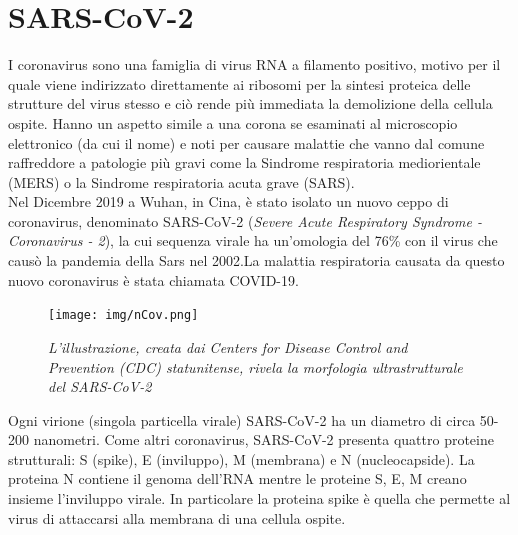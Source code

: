 \documentclass[a4paper,10pt]{article}
\begin{document}
\tableofcontents

\newpage

\section{SARS-CoV-2}
I coronavirus sono una famiglia di virus RNA a filamento positivo, motivo per il quale viene indirizzato direttamente ai ribosomi per la sintesi proteica delle strutture del virus stesso e ciò rende più immediata la demolizione della cellula ospite. Hanno un aspetto simile a una corona se esaminati al microscopio elettronico (da cui il nome) e noti per causare malattie che vanno dal comune raffreddore a patologie più gravi come la Sindrome respiratoria mediorientale (MERS) o la Sindrome respiratoria acuta grave (SARS). \\
Nel Dicembre 2019 a Wuhan, in Cina, è stato isolato un nuovo ceppo di coronavirus, denominato SARS-CoV-2 (\textit{Severe Acute Respiratory Syndrome - Coronavirus - 2}), la cui sequenza virale ha un'omologia del 76\% con il virus che causò la pandemia della Sars nel 2002.La malattia respiratoria causata da questo nuovo coronavirus è stata chiamata COVID-19.

\begin{figure}[H]
\centering
\texttt{[image: img/nCov.png]}
\caption{\textit{L’illustrazione, creata dai Centers for Disease Control and Prevention (CDC) statunitense, rivela la morfologia ultrastrutturale del SARS-CoV-2}}
\label{fig:1}
\end{figure}

Ogni virione (singola particella virale) SARS-CoV-2 ha un diametro di circa 50-200 nanometri. Come altri coronavirus, SARS-CoV-2 presenta quattro proteine strutturali: S (spike), E (inviluppo), M (membrana) e N (nucleocapside). La proteina N contiene il genoma dell'RNA mentre le proteine S, E, M creano insieme l'inviluppo virale. %
In particolare la proteina spike è quella che permette al virus di attaccarsi alla membrana di una cellula ospite.\\
\end{document}
